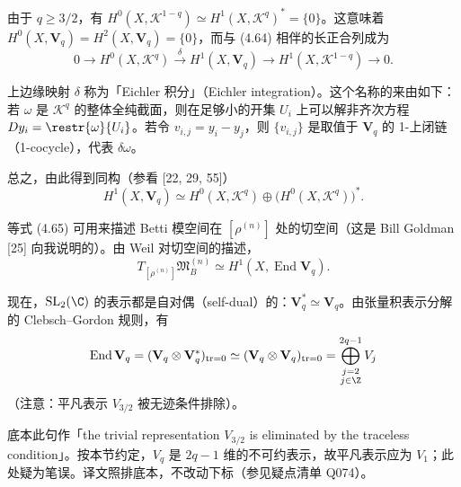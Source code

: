
由于 $q\ge 3/2$，有 $H^0(X,\mathcal{K}^{1-q})\simeq H^1(X,\mathcal{K}^q)^*=\{0\}$。这意味着 $H^0(X,\mathbf{V}_q)=H^2(X,\mathbf{V}_q)=\{0\}$，而与 (4.64) 相伴的长正合列成为
\[
0\longrightarrow H^0(X,\mathcal{K}^q)\xrightarrow{\ \delta\ }H^1(X,\mathbf{V}_q)\longrightarrow H^1(X,\mathcal{K}^{1-q})\longrightarrow 0.
\]

上边缘映射 $\delta$ 称为「Eichler 积分」（Eichler integration）。这个名称的来由如下：若 $\omega$ 是 $\mathcal{K}^q$ 的整体全纯截面，则在足够小的开集 $U_i$ 上可以解非齐次方程 $Dy_i=\restr{\omega}{U_i}$。若令 $v_{i,j}=y_i-y_j$，则 $\{v_{i,j}\}$ 是取值于 $\mathbf{V}_q$ 的 1-上闭链（1-cocycle），代表 $\delta\omega$。

总之，由此得到同构（参看 [22, 29, 55]）
\begin{equation}
H^1(X,\mathbf{V}_q)\simeq H^0(X,\mathcal{K}^q)\oplus\bigl(H^0(X,\mathcal{K}^q)\bigr)^*.
\tag{4.65}
\end{equation}

等式 (4.65) 可用来描述 Betti 模空间在 $[\rho^{(n)}]$ 处的切空间（这是 Bill Goldman [25] 向我说明的）。由 Weil 对切空间的描述，
\begin{equation}
T_{[\rho^{(n)}]}\mathfrak{M}_B^{(n)}\simeq H^1(X,\operatorname{End}\mathbf{V}_q).
\tag{4.66}
\end{equation}

现在，$\mathrm{SL}_2(\C)$ 的表示都是自对偶（self-dual）的：$\mathbf{V}_q^*\simeq\mathbf{V}_q$。由张量积表示分解的 Clebsch--Gordon 规则，有
\[
\operatorname{End}\mathbf{V}_q=(\mathbf{V}_q\otimes\mathbf{V}_q^*)_{\mathrm{tr}=0}\simeq(\mathbf{V}_q\otimes\mathbf{V}_q)_{\mathrm{tr}=0}=\bigoplus_{\substack{j=2\\ j\in\Z}}^{2q-1}V_j
\]
（注意：平凡表示 $V_{3/2}$ 被无迹条件排除）。

\begin{annote}
底本此句作「the trivial representation $V_{3/2}$ is eliminated by the traceless condition」。按本节约定，$V_q$ 是 $2q-1$ 维的不可约表示，故平凡表示应为 $V_1$；此处疑为笔误。译文照排底本，不改动下标（参见疑点清单 Q074）。
\end{annote}

